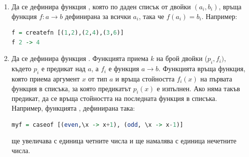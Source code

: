 \begin{enumerate}[]
\begin{figure}

      \caption{Правоъгълна функция, $low=2$, $high=4$, $step=2$}
      \label{fig:rectfn}
    \end{figure}

	\item   Да се дефинира функция , която по даден списък от двойки $(a_i,b_i)$, връща функция $f:a \rightarrow b$ дефинирана за всички $a_i$, така че $f(a_i)=b_i$. Например:

\begin{lstlisting}[basicstyle=\small,language=Haskell]
f = createfn [(1,2),(2,4),(3,6)]
f 2 -> 4
\end{lstlisting}


	\item Да се дефинира функция . Функцията приема $k$ на брой двойки ($p_i,f_i)$, където $p_i$ е предикат над $a$, а $f_i$ е функция $a \rightarrow b$. Функцията  връща функция, която приема аргумент $x$ от тип $a$ и връща стойността $f_i(x)$ на първата функция в списъка, за която предикатът $p_i(x)$ е изпълнен. Ако няма такъв предикат, да се връща стойността на последната функция в списъка. Например, функцията , дефинирана така:
\begin{lstlisting}[basicstyle=\small,language=Haskell]
myf = caseof [(even,\x -> x+1), (odd, \x -> x-1)]
\end{lstlisting}
	ще увеличава с единица четните числа и ще намалява с единица нечетните числа.
		

\end{enumerate}
